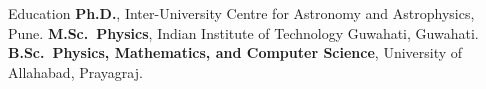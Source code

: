 \begin{rubric}{Education}
%
	\textbf{Ph.D.}, Inter-University Centre for Astronomy and Astrophysics, Pune.
%
\entry*[2019 -- 2021]%
	\textbf{M.Sc.~Physics}, Indian Institute of Technology Guwahati, Guwahati.
% 
\entry*[2016 -- 2019]%
	\textbf{B.Sc.~Physics, Mathematics, and Computer Science}, University of Allahabad, Prayagraj.
\end{rubric}
